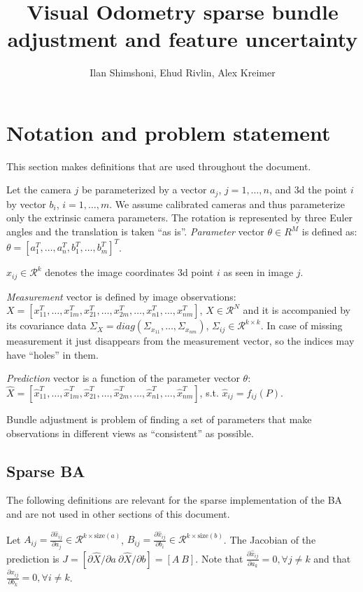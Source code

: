 \documentclass[10pt]{article}         %
\title{Visual Odometry sparse bundle adjustment and feature uncertainty}
\author{Ilan Shimshoni, Ehud Rivlin, Alex Kreimer}
\begin{document}
\maketitle

\section{Notation and problem statement}

This section makes definitions that are used throughout the document.

Let the camera $j$ be parameterized by a vector $a_j$, $j=1,\dotsc,n$,
and 3d the point $i$ by vector $b_i$, $i=1,\dotsc,m$.  We assume
calibrated cameras and thus parameterize only the extrinsic camera
parameters.  The rotation is represented by three Euler angles and the
translation is taken ``as is''. \emph{Parameter} vector
$\theta\in R^M$ is defined as:
$\theta=[a_1^T,\dotsc,a_n^T,b_1^T, \dotsc,b_m^T]^T$.

$x_{ij}\in\mathcal{R}^k$ denotes the image coordinates 3d point $i$ as
seen in image $j$.

\emph{Measurement} vector is defined by image observations:
$X = [x_{11}^T,\dotsc, x_{1m}^T,\allowbreak
x_{21}^T,\dotsc,x_{2m}^T,\dotsc,x_{n1}^T,\dotsc,x_{nm}^T]$,
$X\in\mathcal{R}^N$ and it is accompanied by its covariance data
$\Sigma_X=diag(\Sigma_{x_{11}},\dotsc,\Sigma_{x_{nm}})$,
$\Sigma_{ij}\in \mathcal{R}^{k\times k}$. In case of missing
measurement it just disappears from the measurement vector, so the
indices may have ``holes'' in them.

\emph{Prediction} vector is a function of the parameter vector $\theta$:
$\hat{X} = [\hat{x}_{11}^T,\dotsc,\hat{x}_{1m}^T,\allowbreak
\hat{x}_{21}^T,\dotsc,\allowbreak
\hat{x}_{2m}^T,\dotsc,\hat{x}_{n1}^T,\dotsc,\hat{x}_{nm}^T]$,
s.t. $\hat{x}_{ij} =f_{ij}(P)$.

Bundle adjustment is problem of finding a set of parameters that make
observations in different views as ``consistent'' as possible.

\subsection{Sparse BA}
The following definitions are relevant for the sparse implementation
of the BA and are not used in other sections of this document. 

Let
$A_{ij}= \frac{\partial \hat{x}_{ij}}{\partial a_j}\in
\mathcal{R}^{k\times \text{size}(a)}$,
$B_{ij}= \frac{\partial \hat{x}_{ij}}{\partial b_i}\in
\mathcal{R}^{k\times \text{size}(b)}$.
The Jacobian of the prediction is
$J=[\partial \hat{X}/\partial a\ \partial \hat{X}/\partial b]=[A\ B]$.
Note that
$\frac{\partial \hat{x}_{ij}}{\partial a_k}=0, \forall j\neq k$ and
that $\frac{\partial \hat{x}_{ij}}{\partial b_k}=0, \forall i\neq k$.
\end{document}
